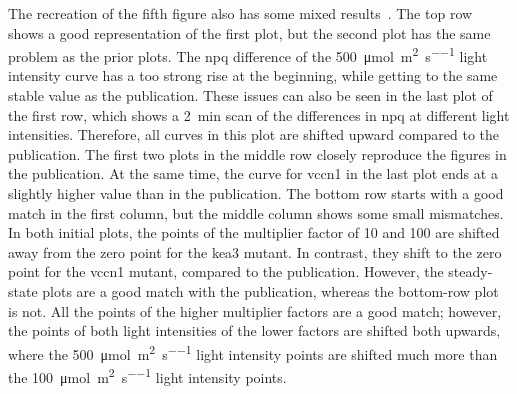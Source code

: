 The recreation of the fifth figure also has some mixed results~. The top row shows a good representation of the first plot, but the second plot has the same problem as the prior plots. The \gls{npq} difference of the \qty{500}{\micro\mol\per\square\meter\per\second} light intensity curve has a too strong rise at the beginning, while getting to the same stable value as the publication. These issues can also be seen in the last plot of the first row, which shows a \qty{2}{\minute} scan of the differences in \gls{npq} at different light intensities. Therefore, all curves in this plot are shifted upward compared to the publication. The first two plots in the middle row closely reproduce the figures in the publication. At the same time, the curve for \gls{vccn1} in the last plot ends at a slightly higher value than in the publication. The bottom row starts with a good match in the first column, but the middle column shows some small mismatches. In both initial plots, the points of the multiplier factor of 10 and 100 are shifted away from the zero point for the \gls{kea3} mutant. In contrast, they shift to the zero point for the \gls{vccn1} mutant, compared to the publication. However, the steady-state plots are a good match with the publication, whereas the bottom-row plot is not. All the points of the higher multiplier factors are a good match; however, the points of both light intensities of the lower factors are shifted both upwards, where the \qty{500}{\micro\mol\per\square\meter\per\second} light intensity points are shifted much more than the \qty{100}{\micro\mol\per\square\meter\per\second} light intensity points.
